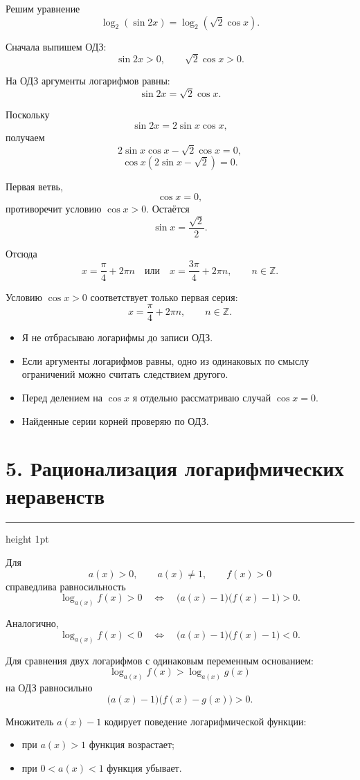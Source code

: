 \documentclass[a4paper,12pt]{article}
\newcommand{\checkitem}{\item[$\square$]}
\newcommand{\Z}{\mathbb{Z}}
\newcommand{\sectionrule}{%
  \vspace{-2mm}
  {\color{lightaccent}\hrule height 1pt}
  \vspace{3mm}
}
\begin{document}
Решим уравнение
\[
\log_2(\sin2x)=\log_2(\sqrt2\cos x).
\]

Сначала выпишем ОДЗ:
\[
\sin2x>0,\qquad \sqrt2\cos x>0.
\]

На ОДЗ аргументы логарифмов равны:
\[
\sin2x=\sqrt2\cos x.
\]

Поскольку
\[
\sin2x=2\sin x\cos x,
\]
получаем
\[
2\sin x\cos x-\sqrt2\cos x=0,
\]
\[
\cos x\left(2\sin x-\sqrt2\right)=0.
\]

Первая ветвь,
\[
\cos x=0,
\]
противоречит условию \(\cos x>0\). Остаётся
\[
\sin x=\frac{\sqrt2}{2}.
\]

Отсюда
\[
x=\frac{\pi}{4}+2\pi n
\quad\text{или}\quad
x=\frac{3\pi}{4}+2\pi n,
\qquad n\in\Z.
\]

Условию \(\cos x>0\) соответствует только первая серия:
\[
\boxed{x=\frac{\pi}{4}+2\pi n,\qquad n\in\Z.}
\]

\begin{itemize}
  \checkitem Я не отбрасываю логарифмы до записи ОДЗ.
  \checkitem Если аргументы логарифмов равны, одно из одинаковых по смыслу
        ограничений можно считать следствием другого.
  \checkitem Перед делением на \(\cos x\) я отдельно рассматриваю случай
        \(\cos x=0\).
  \checkitem Найденные серии корней проверяю по ОДЗ.
\end{itemize}


\section*{\textcolor{darkaccent}{5. Рационализация логарифмических неравенств}}
\sectionrule

Для
\[
a(x)>0,\qquad a(x)\ne1,\qquad f(x)>0
\]
справедлива равносильность
\[
\boxed{
\log_{a(x)}f(x)>0
\quad\Longleftrightarrow\quad
\bigl(a(x)-1\bigr)\bigl(f(x)-1\bigr)>0.
}
\]

Аналогично,
\[
\boxed{
\log_{a(x)}f(x)<0
\quad\Longleftrightarrow\quad
\bigl(a(x)-1\bigr)\bigl(f(x)-1\bigr)<0.
}
\]

Для сравнения двух логарифмов с одинаковым переменным основанием:
\[
\log_{a(x)}f(x)>\log_{a(x)}g(x)
\]
на ОДЗ равносильно
\[
\boxed{
\bigl(a(x)-1\bigr)\bigl(f(x)-g(x)\bigr)>0.
}
\]

Множитель \(a(x)-1\) кодирует поведение логарифмической функции:

\begin{itemize}
  \item при \(a(x)>1\) функция возрастает;
  \item при \(0<a(x)<1\) функция убывает.
\end{itemize}
\end{document}

